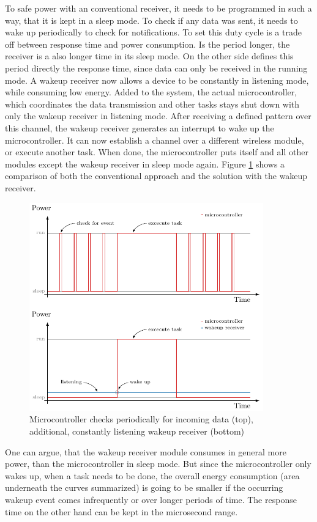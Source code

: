 To safe power with an conventional receiver, it needs to be programmed in such a way, that it is kept in a sleep mode.
To check if any data was sent, it needs to wake up periodically to check for notifications.
To set this duty cycle is a trade off between response time and power consumption.
Is the period longer, the receiver is a also longer time in its sleep mode.
On the other side defines this period directly the response time, since data can only be received in the running mode.
A wakeup receiver now allows a device to be constantly in listening mode, while consuming low energy.
Added to the system, the actual microcontroller, which coordinates the data transmission and other tasks stays shut down with only the wakeup receiver in listening mode.
After receiving a defined pattern over this channel, the wakeup receiver generates an interrupt to wake up the microcontroller. 
It can now establish a channel over a different wireless module, or execute another task.
When done, the microcontroller puts itself and all other modules except the wakeup receiver in sleep mode again.
Figure \ref{theory:wake} shows a comparison of both the conventional approach and the solution with the wakeup receiver. 
\begin{figure}[H]
	\centering
	\includegraphics[width=0.9\textwidth]{2-theory/wakeup/graphics/wake_comp.pdf}
	\caption{Microcontroller checks periodically for incoming data (top), additional, constantly listening  wakeup receiver (bottom)\label{theory:wake}}
\end{figure}
One can argue, that the wakeup receiver module consumes in general more power, than the microcontroller in sleep mode.
But since the microcontroller only wakes up, when a task needs to be done, the overall energy consumption (area underneath the curves summarized) is going to be smaller if the occurring wakeup event comes infrequently or over longer periods of time.
The response time on the other hand can be kept in the microsecond range.